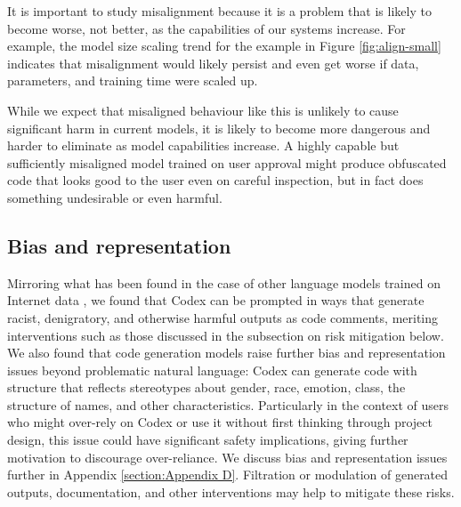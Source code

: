 It is important to study misalignment because it is a problem that is likely to become worse, not better, as the capabilities of our systems increase. For example, the model size scaling trend for the example in Figure \ref{fig:align-small} indicates that misalignment would likely persist and even get worse if data, parameters, and training time were scaled up. 

While we expect that misaligned behaviour like this is unlikely to cause significant harm in current models, it is likely to become more dangerous and harder to eliminate as model capabilities increase. A highly capable but sufficiently misaligned model trained on user approval might produce obfuscated code that looks good to the user even on careful inspection, but in fact does something undesirable or even harmful. 

\subsection{Bias and representation}
\label{sec:impacts:bias}
Mirroring what has been found in the case of other language models trained on Internet data \citep{bender2021dangers, blodgett2020language, abid2021persistent, brown2020gpt3}, we found that Codex can be prompted in ways that generate racist, denigratory, and otherwise harmful outputs as code comments, meriting interventions such as those discussed in the subsection on risk mitigation below. We also found that code generation models raise further bias and representation issues beyond problematic natural language: Codex can generate code with structure that reflects stereotypes about gender, race, emotion, class, the structure of names, and other characteristics. Particularly in the context of users who might over-rely on Codex or use it without first thinking through project design, this issue could have significant safety implications, giving further motivation to discourage over-reliance. We discuss bias and representation issues further in Appendix \ref{section:Appendix D}. Filtration or modulation of generated outputs, documentation, and other interventions may help to mitigate these risks.

